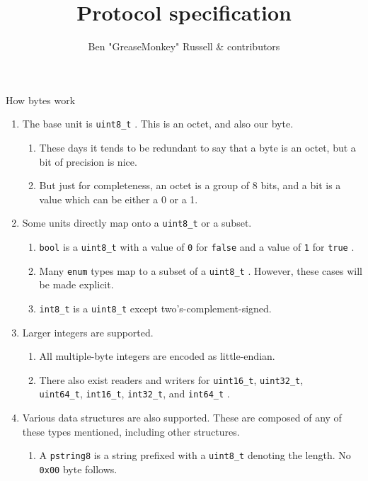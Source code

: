 \documentclass[a4paper,draft]{article}
\title{Protocol specification}
\author{Ben "GreaseMonkey" Russell \& contributors}
\begin{document}
\setlength{\parskip}{0.5\baselineskip}
\maketitle

\tableofcontents
\clearpage

\begin{section}{How bytes work}
  \begin{enumerate}
    \item The base unit is \texttt{uint8\_t} . This is an octet, and also our byte.
    \begin{enumerate}
      \item These days it tends to be redundant to say that a byte is an octet, but a bit of precision is nice.
      \item But just for completeness, an octet is a group of 8 bits, and a bit is a value which can be either a 0 or a 1.
    \end{enumerate}

    \item Some units directly map onto a \texttt{uint8\_t} or a subset.
    \begin{enumerate}
      \item \texttt{bool} is a \texttt{uint8\_t} with a value of \texttt{0} for \texttt{false} and a value of \texttt{1} for \texttt{true} .
      \item Many \texttt{enum} types map to a subset of a \texttt{uint8\_t} . However, these cases will be made explicit.
      \item \texttt{int8\_t} is a \texttt{uint8\_t} except two's-complement-signed.
    \end{enumerate}

    \item Larger integers are supported.
    \begin{enumerate}
      \item All multiple-byte integers are encoded as little-endian.
      \item There also exist readers and writers for \texttt{uint16\_t}, \texttt{uint32\_t}, \\
        \texttt{uint64\_t}, \texttt{int16\_t}, \texttt{int32\_t}, and \texttt{int64\_t} .
    \end{enumerate}

    \item Various data structures are also supported. These are composed of any of these types mentioned, including other structures.
    \begin{enumerate}
      \item A \texttt{pstring8} is a string prefixed with a \texttt{uint8\_t} denoting the length. No \texttt{0x00} byte follows.
    \end{enumerate}


\end{enumerate}
\end{section}
\end{document}
